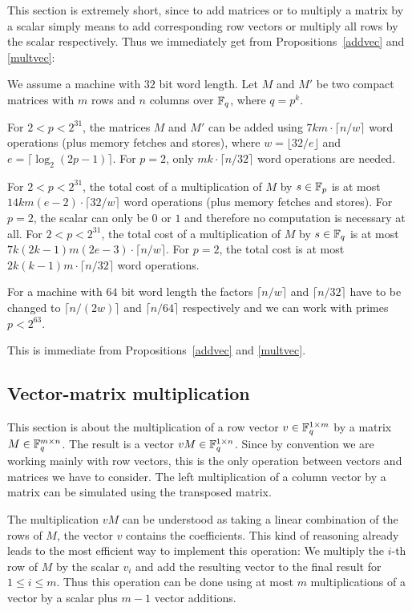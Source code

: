 This section is extremely short, since to add matrices or
to multiply a matrix by a scalar simply means to add corresponding
row vectors or multiply all rows by the scalar respectively.
Thus we immediately get from Propositions~\ref{addvec} and
\ref{multvec}:

\begin{Cor}
We assume a machine with $32$ bit word length. Let $M$ and $M'$ be 
two compact matrices with $m$ rows and $n$ columns over $\mathbb{F}_q$, where $q
= p^k$.

For\/ $2 < p < 2^{31}$, the matrices $M$ and $M'$
can be added using $7km\cdot \lceil n/w \rceil$
word operations
(plus memory fetches and stores), where $w = \lfloor 32/e \rfloor$
and $e = \lceil \log_2(2p-1) \rceil$. 
For $p=2$, only $mk \cdot \lceil n/32 \rceil$ word operations are needed.

For\/ $2 < p < 2^{31}$, the total cost of a multiplication of
$M$ by $s \in \mathbb{F}_p$ is at most 
$14km(e-2)\cdot \lceil 32/w \rceil$ word operations (plus memory fetches
and stores). For $p=2$, the scalar
can only be $0$ or $1$ and therefore no computation is necessary at all.
For\/ $2 < p < 2^{31}$, the total cost of a multiplication of $M$
by $s \in \mathbb{F}_q$ is at most
$7k(2k-1)m(2e-3)\cdot \lceil n/w \rceil$.
 For $p = 2$, the total cost is
at most $2k(k-1)m \cdot \lceil n/32 \rceil$ word operations.

For a machine with $64$ bit word length the factors $\lceil n/w \rceil$
and $\lceil n/32 \rceil$ have to be changed to $\lceil n/(2w) \rceil$
and $\lceil n/64 \rceil$ respectively
and we can work with primes $p < 2^{63}$.
\end{Cor}
\Proof This is immediate from Propositions~\ref{addvec} and \ref{multvec}.
\ProofEnd

\subsection{Vector-matrix multiplication}
\label{ssec:vecmat}

This section is about the multiplication of a row vector 
$v \in \mathbb{F}_q^{1 \times m}$ by a matrix $M \in \mathbb{F}_q^{m \times n}$. The result
is a vector $vM \in \mathbb{F}_q^{1 \times n}$. Since by convention we are working 
mainly with row vectors, this is the only operation between vectors
and matrices we have to consider. The left multiplication of a column
vector by a matrix can be simulated using the transposed matrix.

The multiplication $vM$ can be understood as taking a linear combination
of the rows of $M$, the vector $v$ contains the coefficients. This
kind of reasoning already leads to the most efficient way to implement
this operation: We multiply the $i$-th row of $M$ by the scalar
$v_i$ and add the resulting vector to the final result for $1 \le i \le m$.
Thus this operation can be done using at most $m$ multiplications
of a vector by a scalar plus $m-1$ vector additions.

